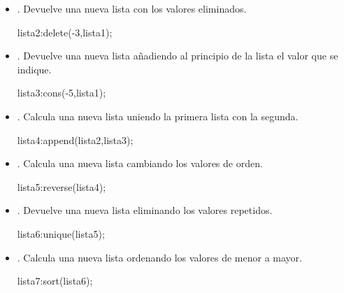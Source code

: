 \begin{itemize}

	\item {}. Devuelve una nueva lista con los valores
		eliminados.
		\begin{maximai}
			lista2:delete(-3,lista1);
		\end{maximai}\begin{maximao}
			\left[ 2 , 5 , 6 \right]
		\end{maximao}

	\item {}. Devuelve una nueva lista añadiendo al principio
		de la lista el valor que se indique.
		\begin{maximai}
			lista3:cons(-5,lista1);
		\end{maximai}\begin{maximao}
			\left[ -5 , 2 , -3 , 5 , 6 \right]
		\end{maximao}

	\item {}. Calcula una nueva lista uniendo la primera
		lista con la segunda.
		\begin{maximai}
			lista4:append(lista2,lista3);
		\end{maximai}\begin{maximao}
			\left[ 2 , 5 , 6 , -5 , 2 , -3 , 5 , 6 \right]
		\end{maximao}

	\item {}. Calcula una nueva lista cambiando los
		valores de orden.
		\begin{maximai}
			lista5:reverse(lista4);
		\end{maximai}\begin{maximao}
			\left[ 6 , 5 , -3 , 2 , -5 , 6 , 5 , 2 \right]
		\end{maximao}

	\item {}. Devuelve una nueva lista eliminando los
		valores repetidos.
		\begin{maximai}
			lista6:unique(lista5);
		\end{maximai}\begin{maximao}
			\left[ -5 , -3 , 2 , 5 , 6 \right]
		\end{maximao}

	\item {}. Calcula una nueva lista ordenando los valores
		de menor a mayor.
		\begin{maximai}
			lista7:sort(lista6);
		\end{maximai}\begin{maximao}
			\left[ -5 , -3 , 2 , 5 , 6 \right]
		\end{maximao}


\end{itemize}
